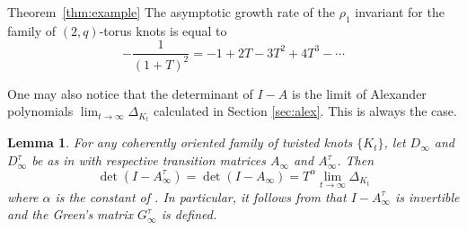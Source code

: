 \documentclass[11pt,hyp,]{nyjm}
\numberwithin{thm}{section}
\newtheorem{lemma}[thm]{Lemma}
\newtheorem*{namedtheorem}{\theoremname}
\newcommand{\theoremname}{testing}
\newenvironment{named_thm}[1]{\renewcommand{\theoremname}{#1}\begin{namedtheorem}}{\end{namedtheorem}}
\newcommand{\refthm}[1]{Theorem~\ref{thm:#1}}
\theoremstyle{definition}
\theoremstyle{remark}
\begin{document}
	\begin{named_thm}{\refthm{example}}
		The asymptotic growth rate of the $\rho_1$ invariant for the family of $(2,q)$-torus knots is equal to
		$$
		-\frac{1}{(1 + T)^2} = -1 + 2T - 3T^2 + 4T^3 - \cdots
		$$
	\end{named_thm}

	One may also notice that the determinant of $I - A$ is the limit of Alexander polynomials $\lim_{t \to \infty} \Delta_{K_t}$ calculated in Section \ref{sec:alex}. This is always the case.

	\begin{lemma}
		\label{lem:final}
		For any coherently oriented family of twisted knots $\{K_t\}$, let $D_\infty$ and $D^\tau_\infty$ be as in  with respective transition matrices $A_\infty$ and $A^\tau_\infty$. Then
		$$
		\det(I - A^\tau_\infty) = \det(I - A_\infty) = T^\alpha \lim_{t \to \infty} \Delta_{K_t}
		$$
		where $\alpha$ is the constant of . In particular, it follows from  that $I - A^\tau_\infty$ is invertible and the Green's matrix $G^\tau_\infty$ is defined.
	\end{lemma}
\end{document}
